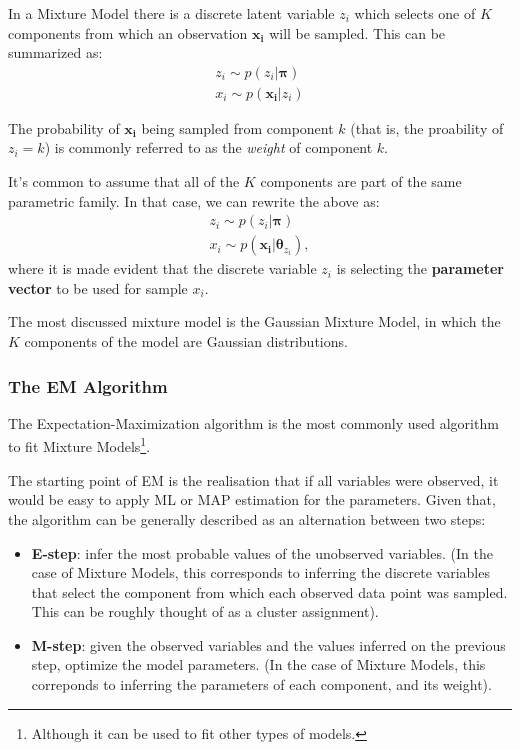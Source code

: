 In a Mixture Model there is a discrete latent variable $z_i$ which selects
one of $K$ components from which an observation $\bm{x_i}$ will be sampled. This
can be summarized as:
\begin{align}
    z_i \sim p(z_i | \bm\pi) \\
    x_i \sim p(\bm{x_i} | z_i)
\end{align}

The probability of $\bm{x_i}$ being sampled from component $k$ (that is, the proability
of $z_i = k$) is commonly referred to as the \emph{weight} of component $k$.

It's common to assume that all of the $K$ components are part of the same
parametric family. In that case, we can rewrite the above as:
\begin{align}
    z_i \sim p(z_i | \bm\pi) \\
    x_i \sim p(\bm{x_i} | \bm{\theta}_{z_i}),
\end{align} where it is made evident that the discrete variable $z_i$ is selecting
the \textbf{parameter vector} to be used for sample $x_i$.

The most discussed mixture model is the Gaussian Mixture Model, in which the $K$
components of the model are Gaussian distributions.

\subsubsection{The EM Algorithm}
The Expectation-Maximization algorithm is the most commonly used algorithm to
fit Mixture Models\footnote{Although it can be used to fit other types of models.}.

The starting point of EM is the realisation that if all variables were observed,
it would be easy to apply ML or MAP estimation for the parameters. Given that,
the algorithm can be generally described as an alternation between two steps:
\begin{itemize}
    \item \textbf{E-step}: infer the most probable values of the unobserved variables.
        (In the case of Mixture Models, this corresponds to inferring the discrete
        variables that select the component from which each observed data point
        was sampled. This can be roughly thought of as a cluster assignment).
    \item \textbf{M-step}: given the observed variables and the values inferred
        on the previous step, optimize the model parameters. (In the case of 
        Mixture Models, this correponds to inferring the parameters of each
        component, and its weight).
\end{itemize}

